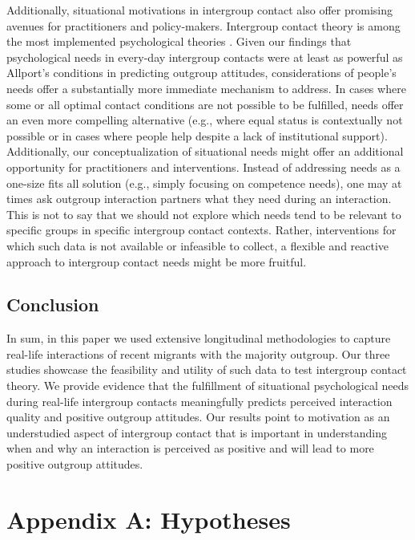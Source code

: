 \documentclass[man, 12pt, a4paper, mask]{apa7}
\theoremstyle{break}
\theoremstyle{plain}
\begin{document}
Additionally, situational motivations in intergroup contact also offer promising avenues for practitioners and policy-makers. Intergroup contact theory is among the most implemented psychological theories \citep[e.g.,][]{Pettigrew2006, AlRamiah2012a, Reimer2021}. Given our findings that psychological needs in every-day intergroup contacts were at least as powerful as Allport's conditions in predicting outgroup attitudes, considerations of people's needs offer a substantially more immediate mechanism to address. In cases where some or all optimal contact conditions are not possible to be fulfilled, needs offer an even more compelling alternative (e.g., where equal status is contextually not possible or in cases where people help despite a lack of institutional support). Additionally, our conceptualization of situational needs might offer an additional opportunity for practitioners and interventions. Instead of addressing needs as a one-size fits all solution (e.g., simply focusing on competence needs), one may at times ask outgroup interaction partners what they need during an interaction. This is not to say that we should not explore which needs tend to be relevant to specific groups in specific intergroup contact contexts. Rather, interventions for which such data is not available or infeasible to collect, a flexible and reactive approach to intergroup contact needs might be more fruitful.


\subsection{Conclusion}
In sum, in this paper we used extensive longitudinal methodologies to capture real-life interactions of recent migrants with the majority outgroup. Our three studies showcase the feasibility and utility of such data to test intergroup contact theory. We provide evidence that the fulfillment of situational psychological needs during real-life intergroup contacts meaningfully predicts perceived interaction quality and positive outgroup attitudes. Our results point to motivation as an understudied aspect of intergroup contact that is important in understanding when and why an interaction is perceived as positive and will lead to more positive outgroup attitudes.

\printbibliography

\appendix

\section{Appendix A: Hypotheses}
\label{app:AppendixHypotheses}
\end{document}
